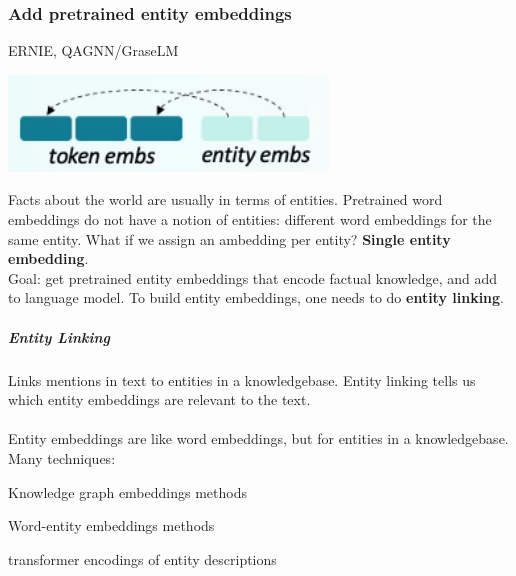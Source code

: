 \documentclass[10pt]{report}
\begin{document}
\subsubsection{Add pretrained entity embeddings} ERNIE, QAGNN/GraseLM
\begin{center}
	\includegraphics[scale=0.5]{106.png}
\end{center}
Facts about the world are usually in terms of entities. Pretrained word embeddings do not have a notion of entities: different word embeddings for the same entity. What if we assign an ambedding per entity? \textbf{Single entity embedding}.\\
Goal: get pretrained entity embeddings that encode factual knowledge, and add to language model. To build entity embeddings, one needs to do \textbf{entity linking}.
\subparagraph{Entity Linking} Links mentions in text to entities in a knowledgebase. Entity linking tells us which entity embeddings are relevant to the text.\\\\
Entity embeddings are like word embeddings, but for entities in a knowledgebase. Many techniques:
\begin{list}{}{}
	\item Knowledge graph embeddings methods
	\item Word-entity embeddings methods
	\item transformer encodings of entity descriptions
\end{list}
\end{document}
